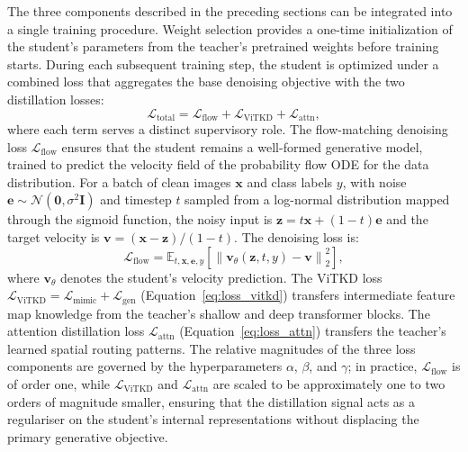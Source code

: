 The three components described in the preceding sections can be integrated into a single training procedure. Weight selection provides a one-time initialization of the student's parameters from the teacher's pretrained weights before training starts. During each subsequent training step, the student is optimized under a combined loss that aggregates the base denoising objective with the two distillation losses:
%
\begin{equation}
    \mathcal{L}_{\text{total}} = \mathcal{L}_{\text{flow}} + \mathcal{L}_{\text{ViTKD}} + \mathcal{L}_{\text{attn}},
    \label{eq:loss_total}
\end{equation}
%
where each term serves a distinct supervisory role. The flow-matching denoising loss $\mathcal{L}_{\text{flow}}$ ensures that the student remains a well-formed generative model, trained to predict the velocity field of the probability flow ODE for the data distribution. For a batch of clean images $\mathbf{x}$ and class labels $y$, with noise $\mathbf{e} \sim \mathcal{N}(\mathbf{0}, \sigma^2 \mathbf{I})$ and timestep $t$ sampled from a log-normal distribution mapped through the sigmoid function, the noisy input is $\mathbf{z} = t\mathbf{x} + (1-t)\mathbf{e}$ and the target velocity is $\mathbf{v} = (\mathbf{x} - \mathbf{z}) / (1 - t)$. The denoising loss is:
%
\begin{equation}
    \mathcal{L}_{\text{flow}} = \mathbb{E}_{t, \mathbf{x}, \mathbf{e}, y}\!\left[ \left\| \mathbf{v}_\theta(\mathbf{z}, t, y) - \mathbf{v} \right\|_2^2 \right],
    \label{eq:loss_flow}
\end{equation}
%
where $\mathbf{v}_\theta$ denotes the student's velocity prediction. The ViTKD loss $\mathcal{L}_{\text{ViTKD}} = \mathcal{L}_{\text{mimic}} + \mathcal{L}_{\text{gen}}$ (Equation~\eqref{eq:loss_vitkd}) transfers intermediate feature map knowledge from the teacher's shallow and deep transformer blocks. The attention distillation loss $\mathcal{L}_{\text{attn}}$ (Equation~\eqref{eq:loss_attn}) transfers the teacher's learned spatial routing patterns. The relative magnitudes of the three loss components are governed by the hyperparameters $\alpha$, $\beta$, and $\gamma$; in practice, $\mathcal{L}_{\text{flow}}$ is of order one, while $\mathcal{L}_{\text{ViTKD}}$ and $\mathcal{L}_{\text{attn}}$ are scaled to be approximately one to two orders of magnitude smaller, ensuring that the distillation signal acts as a regulariser on the student's internal representations without displacing the primary generative objective.

